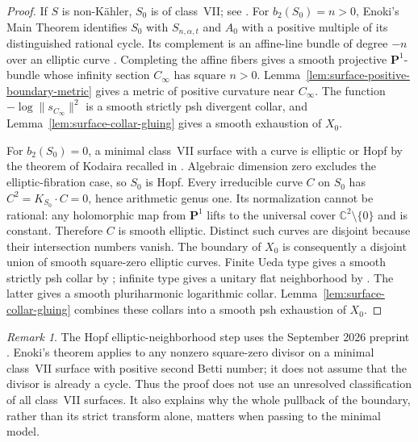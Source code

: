 \documentclass[11pt]{amsart}
\theoremstyle{definition}
\theoremstyle{remark}
\newtheorem{remark}[theorem]{Remark}
\numberwithin{equation}{section}
\newcommand{\C}{\mathbb C}
\newcommand{\PP}{\mathbf P}
\begin{document}
\begin{proof}
If $S$ is non-K\"ahler, $S_0$ is of class~VII; see \cite[Section~2]{FN2005}. For
$b_2(S_0)=n>0$, Enoki's Main Theorem \cite[p.~454]{Enoki} identifies $S_0$ with
$S_{n,\alpha,t}$ and $A_0$ with a positive multiple of its distinguished rational cycle. Its
complement is an affine-line bundle of degree $-n$ over an elliptic curve \cite[(0.4),
p.~453]{Enoki}. Completing the affine fibers gives a smooth projective $\PP^1$-bundle whose
infinity section $C_\infty$ has square $n>0$.
Lemma~\ref{lem:surface-positive-boundary-metric} gives a metric of
positive curvature near $C_\infty$. The function
$-\log\|s_{C_\infty}\|^2$ is a smooth strictly psh divergent collar,
and Lemma~\ref{lem:surface-collar-gluing} gives a smooth exhaustion of $X_0$.

For $b_2(S_0)=0$, a minimal class~VII surface with a curve is elliptic or Hopf by the
theorem of Kodaira recalled in \cite[p.~453]{Enoki}. Algebraic dimension zero excludes the
elliptic-fibration case, so $S_0$ is Hopf. Every irreducible curve $C$ on $S_0$ has
$C^2=K_{S_0}\cdot C=0$, hence arithmetic genus one. Its normalization cannot be rational:
any holomorphic map from $\PP^1$ lifts to the universal cover $\C^2\setminus\{0\}$ and is
constant. Therefore $C$ is smooth elliptic. Distinct such curves are disjoint because their
intersection numbers vanish. The boundary of $X_0$ is consequently a disjoint union of
smooth square-zero elliptic curves. Finite Ueda type gives a smooth strictly psh collar by
\cite[Theorem 2.5]{CLPT2018}; infinite type gives a unitary flat neighborhood by
\cite[Theorem 1.6]{CFSTZ2026}. The latter gives a smooth pluriharmonic logarithmic collar.
Lemma~\ref{lem:surface-collar-gluing} combines these collars into a smooth psh exhaustion of
$X_0$.
\end{proof}

\begin{remark}
The Hopf elliptic-neighborhood step uses the September 2026 preprint \cite{CFSTZ2026}.
Enoki's theorem applies to any nonzero square-zero divisor on a minimal class~VII surface
with positive second Betti number; it does not assume that the divisor is already a cycle.
Thus the proof does not use an unresolved classification of all class~VII surfaces. It also
explains why the whole pullback of the boundary, rather than its strict transform alone,
matters when passing to the minimal model.
\end{remark}
\end{document}
